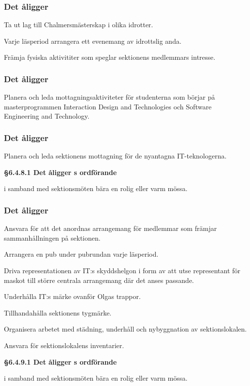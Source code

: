 \subsubsection{Det åligger \FRITID}
\begin{att}
	\item Ta ut lag till Chalmersmästerskap i olika idrotter.
	\item Varje läsperiod arrangera ett evenemang av idrottslig anda.
	\item Främja fysiska aktivititer som speglar sektionens medlemmars intresse.
\end{att}

\subsubsection{Det åligger \MRCIT}
\begin{att}
  \item Planera och leda mottagningsaktiviteter för studenterna som börjar på masterprogrammen Interaction Design and Technologies och Software Engineering and Technology.
\end{att}

\subsubsection{Det åligger \NOLLKIT}
\begin{att}
	\item Planera och leda sektionens mottagning för de nyantagna IT-teknologerna.
\end{att}
\textbf{§6.4.8.1 Det åligger \NOLLKIT{}s ordförande}
\begin{att}
	\item  i samband med sektionsmöten bära en rolig eller varm mössa.
\end{att}

\subsubsection{Det åligger \PRIT}
\begin{att}
	\item Ansvara för att det anordnas arrangemang för medlemmar som främjar sammanhållningen på sektionen.
	\item Arrangera en pub under pubrundan varje läsperiod.
	\item Driva representationen av IT:s skyddshelgon i form av att utse representant för maskot till större centrala arrangemang där det anses passande.
	\item Underhålla IT:s märke ovanför Olgas trappor.
	\item Tillhandahålla sektionens tygmärke.
	\item Organisera arbetet med städning, underhåll och nybyggnation av sektionslokalen.
	\item Ansvara för sektionslokalens inventarier.
\end{att}
\textbf{§6.4.9.1 Det åligger \PRIT{}s ordförande}
\begin{att}
	\item  i samband med sektionsmöten bära en rolig eller varm mössa.
\end{att}

